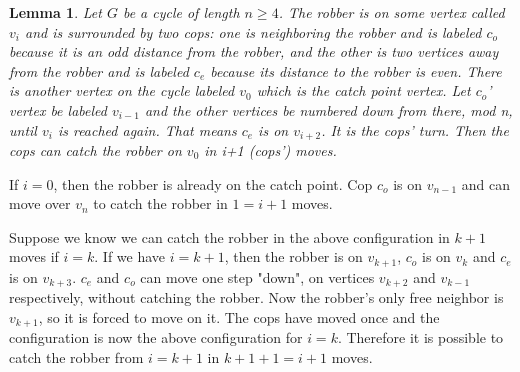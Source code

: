 \documentclass{article}
\newtheorem{lemma}[theorem]{Lemma}
\newenvironment{proof}[1][Proof]{\begin{trivlist}
\item[\hskip \labelsep {\bfseries #1}]}{\end{trivlist}}
\begin{document}
\begin{lemma}
\label{ circling the cycle }
Let $G$ be a cycle of length $n \ge 4$. The robber is on some vertex called $v_i$ and is surrounded by two cops: one is neighboring the robber and is labeled $c_o$ because it is an odd distance from the robber, and the other is two vertices away from the robber and is labeled $c_e$ because its distance to the robber is even. There is another vertex on the cycle labeled $v_0$ which is the catch point vertex. Let $c_o$' vertex be labeled $v_{i-1}$ and the other vertices be numbered down from there, mod n, until $v_i$ is reached again. That means $c_e$ is on $v_{i+2}$. It is the cops' turn. Then the cops can catch the robber on $v_0$ in i+1 (cops') moves.

\end{lemma}      
\begin{proof}
If $i = 0$, then the robber is already on the catch point. Cop $c_o$ is on $v_{n-1}$ and can move over $v_n$ to catch the robber in $1 = i + 1$ moves.

Suppose we know we can catch the robber in the above configuration in $k+1$ moves if $i = k$. If we have $i = k+1$, then the robber is on $v_{k+1}$, $c_o$ is on $v_k$ and $c_e$ is on $v_{k+3}$. $c_e$ and $c_o$ can move one step "down", on vertices $v_{k+2}$ and $v_{k-1}$ respectively, without catching the robber. Now the robber's only free neighbor is $v_{k+1}$, so it is forced to move on it. The cops have moved once and the configuration is now the above configuration for $i = k$. Therefore it is possible to catch the robber from $i = k+1$ in $k+1+1 = i+1$ moves.
\end{proof}
\end{document}
